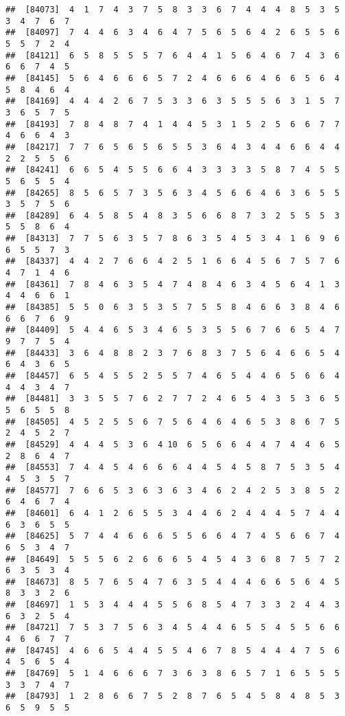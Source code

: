 \documentclass[
]{book}
\begin{document}
\begin{verbatim}
##  [84073]  4  1  7  4  3  7  5  8  3  3  6  7  4  4  4  8  5  3  5  3  4  7  6  7
##  [84097]  7  4  4  6  3  4  6  4  7  5  6  5  6  4  2  6  5  5  6  5  5  7  2  4
##  [84121]  6  5  8  5  5  5  7  6  4  4  1  5  6  4  6  7  4  3  6  6  6  7  4  5
##  [84145]  5  6  4  6  6  6  5  7  2  4  6  6  6  4  6  6  5  6  4  5  8  4  6  4
##  [84169]  4  4  4  2  6  7  5  3  3  6  3  5  5  5  6  3  1  5  7  3  6  5  7  5
##  [84193]  7  8  4  8  7  4  1  4  4  5  3  1  5  2  5  6  6  7  7  4  6  6  4  3
##  [84217]  7  7  6  5  6  5  6  5  5  3  6  4  3  4  4  6  6  4  4  2  2  5  5  6
##  [84241]  6  6  5  4  5  5  6  6  4  3  3  3  3  5  8  7  4  5  5  5  6  5  5  4
##  [84265]  8  5  6  5  7  3  5  6  3  4  5  6  6  4  6  3  6  5  5  3  5  7  5  6
##  [84289]  6  4  5  8  5  4  8  3  5  6  6  8  7  3  2  5  5  5  3  5  5  8  6  4
##  [84313]  7  7  5  6  3  5  7  8  6  3  5  4  5  3  4  1  6  9  6  6  5  5  7  3
##  [84337]  4  4  2  7  6  6  4  2  5  1  6  6  4  5  6  7  5  7  6  4  7  1  4  6
##  [84361]  7  8  4  6  3  5  4  7  4  8  4  6  3  4  5  6  4  1  3  4  4  6  6  1
##  [84385]  5  5  0  6  3  5  3  5  7  5  5  8  4  6  6  3  8  4  6  6  6  7  6  9
##  [84409]  5  4  4  6  5  3  4  6  5  3  5  5  6  7  6  6  5  4  7  9  7  7  5  4
##  [84433]  3  6  4  8  8  2  3  7  6  8  3  7  5  6  4  6  6  5  4  6  4  3  6  5
##  [84457]  6  5  4  5  5  2  5  5  7  4  6  5  4  4  6  5  6  6  4  4  4  3  4  7
##  [84481]  3  3  5  5  7  6  2  7  7  2  4  6  5  4  3  5  3  6  5  5  6  5  5  8
##  [84505]  4  5  2  5  5  6  7  5  6  4  6  4  6  5  3  8  6  7  5  2  4  5  2  7
##  [84529]  4  4  4  5  3  6  4 10  6  5  6  6  4  4  7  4  4  6  5  2  8  6  4  7
##  [84553]  7  4  4  5  4  6  6  6  4  4  5  4  5  8  7  5  3  5  4  4  5  3  5  7
##  [84577]  7  6  6  5  3  6  3  6  3  4  6  2  4  2  5  3  8  5  2  6  4  6  7  4
##  [84601]  6  4  1  2  6  5  5  3  4  4  6  2  4  4  4  5  7  4  4  6  3  6  5  5
##  [84625]  5  7  4  4  6  6  6  5  5  6  6  4  7  4  5  6  6  7  4  6  5  3  4  7
##  [84649]  5  5  5  6  2  6  6  6  5  4  5  4  3  6  8  7  5  7  2  6  3  5  3  4
##  [84673]  8  5  7  6  5  4  7  6  3  5  4  4  4  6  6  5  6  4  5  8  3  3  2  6
##  [84697]  1  5  3  4  4  4  5  5  6  8  5  4  7  3  3  2  4  4  3  6  3  2  5  4
##  [84721]  7  5  3  7  5  6  3  4  5  4  4  6  5  5  4  5  5  6  6  4  6  6  7  7
##  [84745]  4  6  6  5  4  4  5  5  4  6  7  8  5  4  4  4  7  5  6  4  5  6  5  4
##  [84769]  5  1  4  6  6  6  7  3  6  3  8  6  5  7  1  6  5  5  5  3  3  7  4  7
##  [84793]  1  2  8  6  6  7  5  2  8  7  6  5  4  5  8  4  8  5  3  6  5  9  5  5

\end{verbatim}
\end{document}
